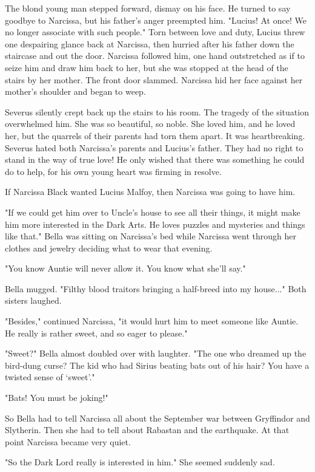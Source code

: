 \documentclass[a4paper,11pt]{article}
\begin{document}
The blond young man stepped forward, dismay on his face. He turned to say goodbye to Narcissa, but his father's anger preempted him. "Lucius! At once! We no longer associate with such people." Torn between love and duty, Lucius threw one despairing glance back at Narcissa, then hurried after his father down the staircase and out the door. Narcissa followed him, one hand outstretched as if to seize him and draw him back to her, but she was stopped at the head of the stairs by her mother. The front door slammed. Narcissa hid her face against her mother's shoulder and began to weep.

Severus silently crept back up the stairs to his room. The tragedy of the situation overwhelmed him. She was so beautiful, so noble. She loved him, and he loved her, but the quarrels of their parents had torn them apart. It was heartbreaking. Severus hated both Narcissa's parents and Lucius's father. They had no right to stand in the way of true love! He only wished that there was something he could do to help, for his own young heart was firming in resolve.

If Narcissa Black wanted Lucius Malfoy, then Narcissa was going to have him.

"If we could get him over to Uncle's house to see all their things, it might make him more interested in the Dark Arts. He loves puzzles and mysteries and things like that." Bella was sitting on Narcissa's bed while Narcissa went through her clothes and jewelry deciding what to wear that evening.

"You know Auntie will never allow it. You know what she'll say."

Bella mugged. "Filthy blood traitors bringing a half-breed into my house..." Both sisters laughed.

"Besides," continued Narcissa, "it would hurt him to meet someone like Auntie. He really is rather sweet, and so eager to please."

"Sweet?" Bella almost doubled over with laughter. "The one who dreamed up the bird-dung curse? The kid who had Sirius beating bats out of his hair? You have a twisted sense of `sweet'."

"Bats! You must be joking!"

So Bella had to tell Narcissa all about the September war between Gryffindor and Slytherin. Then she had to tell about Rabastan and the earthquake. At that point Narcissa became very quiet.

"So the Dark Lord really is interested in him." She seemed suddenly sad.
\end{document}

